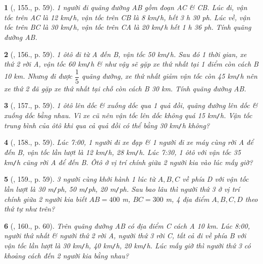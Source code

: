 \documentclass{article}
\newtheorem{baitoan}{}
\begin{document}
\begin{baitoan}[\cite{Binh_Toan_6_tap_2}, 155., p. 59]
	1 người đi quãng đường AB gồm đoạn AC \& CB. Lúc đi, vận tốc trên AC là {\rm12 km{\tt/}h}, vận tốc trên CB là {\rm8 km{\tt/}h}, hết {\rm3 h 30 ph}. Lúc về, vận tốc trên BC là {\rm30 km{\tt/}h}, vận tốc trên CA là {\rm20 km{\tt/}h} hết {\rm1 h 36 ph}. Tính quãng đường AB.
\end{baitoan}

\begin{baitoan}[\cite{Binh_Toan_6_tap_2}, 156., p. 59]
	1 ôtô đi từ A đến B, vận tốc {\rm50 km{\tt/}h}. Sau đó 1 thời gian, xe thứ 2 rời A, vận tốc {\rm60 km{\tt/}h} \& như vậy sẽ gặp xe thứ nhất tại 1 điểm còn cách B {\rm10 km}. Nhưng đi được $\dfrac{1}{5}$ quãng đường, xe thứ nhất giảm vận tốc còn {\rm45 km{\tt/}h} nên xe thứ 2 đã gặp xe thứ nhất tại chỗ còn cách B {\rm30 km}. Tính quãng đường AB.
\end{baitoan}

\begin{baitoan}[\cite{Binh_Toan_6_tap_2}, 157., p. 59]
	1 ôtô lên dốc \& xuống dốc qua 1 quả đồi, quãng đường lên dốc \& xuống dốc bằng nhau. Vì xe cũ nên vận tốc lên dốc không quá {\rm15 km{\tt/}h}. Vận tốc trung bình của ôtô khi qua cả quả đồi có thể bằng {\rm30 km{\tt/}h} không?
\end{baitoan}

\begin{baitoan}[\cite{Binh_Toan_6_tap_2}, 158., p. 59]
	Lúc {\rm7:00}, 1 người đi xe đạp \& 1 người đi xe máy cùng rời A để đến B, vận tốc lần lượt là {\rm12 km{\tt/}h, 28 km{\tt/}h}. Lúc {\rm7:30}, 1 ôtô với vận tốc {\rm35 km{\tt/}h} cũng rời A để đến B. Ôtô ở vị trí chính giữa 2 người kia vào lúc mấy giờ?
\end{baitoan}

\begin{baitoan}[\cite{Binh_Toan_6_tap_2}, 159., p. 59]
	3 người cùng khởi hành 1 lúc từ $A,B,C$ về phía D với vận tốc lần lượt là {\rm30 m{\tt/}ph, 50 m{\tt/}ph, 20 m{\tt/}ph}. Sau bao lâu thì người thứ 3 ở vị trí chính giữa 2 người kia biết $AB = 400$ {\rm m}, $BC = 300$ {\rm m}, 4 địa điểm $A,B,C,D$ theo thứ tự như trên?
\end{baitoan}

\begin{baitoan}[\cite{Binh_Toan_6_tap_2}, 160., p. 60]
	Trên quãng đường AB có địa điểm C cách A {\rm10 km}. Lúc {\rm8:00}, người thứ nhất \& người thứ 2 rời A, người thứ 3 rời C, tất cả đi về phía B với vận tốc lần lượt là {\rm30 km{\tt/}h, 40 km{\tt/}h, 20 km{\tt/}h}. Lúc mấy giờ thì người thứ 3 có khoảng cách đến 2 người kia bằng nhau?
\end{baitoan}
\end{document}
